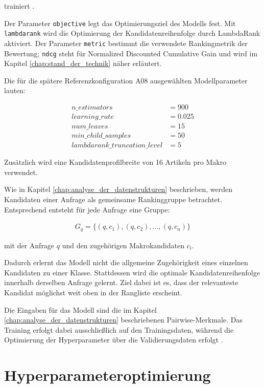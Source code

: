 trainiert \parencite{srcStep931}.

Der Parameter \texttt{objective} legt das Optimierungsziel des Modells fest. Mit \texttt{lambdarank} wird die Optimierung der Kandidatenreihenfolge durch LambdaRank aktiviert. Der Parameter \texttt{metric} bestimmt die verwendete Rankingmetrik der Bewertung; \texttt{ndcg} steht für Normalized Discounted Cumulative Gain und wird im Kapitel \ref{chap:stand_der_technik} näher erläutert.

Die für die spätere Referenzkonfiguration A08 ausgewählten Modellparameter lauten: 

\begin{align} 
    n\_estimators &= 900 \\ 
    learning\_rate &= 0.025 \\ 
    num\_leaves &= 15 \\ 
    min\_child\_samples &= 50 \\ 
    lambdarank\_truncation\_level &= 5 
\end{align}

Zusätzlich wird eine Kandidatenprofilbreite von 16 Artikeln pro Makro verwendet. 

Wie in Kapitel \ref{chap:analyse_der_datenstrukturen} beschrieben, werden Kandidaten einer Anfrage als gemeinsame Rankinggruppe betrachtet.
Entsprechend entsteht für jede Anfrage eine Gruppe:

\begin{align} 
    G_q = \{(q,c_1),(q,c_2),\dots,(q,c_n)\} 
\end{align} 

mit der Anfrage $q$ und den zugehörigen Makrokandidaten $c_i$.

Dadurch erlernt das Modell nicht die allgemeine Zugehörigkeit eines einzelnen Kandidaten zu einer Klasse. Stattdessen wird die optimale Kandidatenreihenfolge innerhalb derselben Anfrage gelernt.
Ziel dabei ist es, dass der relevanteste Kandidat möglichst weit oben in der Rangliste erscheint.

Die Eingaben für das Modell sind die im Kapitel \ref{chap:analyse_der_datenstrukturen} beschriebenen Pairwise-Merkmale.
Das Training erfolgt dabei ausschließlich auf den Trainingsdaten, während die Optimierung der Hyperparameter über die Validierungsdaten erfolgt \parencite{srcStep931}.

\section{Hyperparameteroptimierung}

